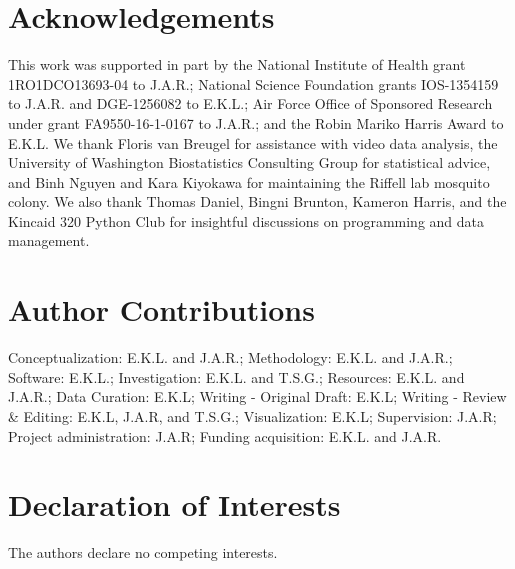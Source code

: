 \section*{Acknowledgements}
\footnotesize
\noindent This work was supported in part by the National Institute of Health grant 1RO1DCO13693-04 to J.A.R.; National Science Foundation grants IOS-1354159 to J.A.R. and DGE-1256082 to E.K.L.; Air Force Office of Sponsored Research under grant FA9550-16-1-0167 to J.A.R.; and the Robin Mariko Harris Award to E.K.L. We thank Floris van Breugel for assistance with video data analysis, the University of Washington Biostatistics Consulting Group for statistical advice, and Binh Nguyen and Kara Kiyokawa for maintaining the Riffell lab mosquito colony. We also thank Thomas Daniel, Bingni Brunton, Kameron Harris, and the Kincaid 320 Python Club for insightful discussions on programming and data management.  

\section*{Author Contributions}
\footnotesize
\noindent Conceptualization: E.K.L. and J.A.R.; Methodology: E.K.L. and J.A.R.; Software: E.K.L.; Investigation: E.K.L. and T.S.G.; Resources: E.K.L. and J.A.R.; Data Curation: E.K.L; Writing - Original Draft: E.K.L; Writing - Review & Editing: E.K.L, J.A.R, and T.S.G.; Visualization: E.K.L; Supervision: J.A.R; Project administration: J.A.R; Funding acquisition: E.K.L. and J.A.R.

\section*{Declaration of Interests}
\footnotesize
\noindent The authors declare no competing interests. 
